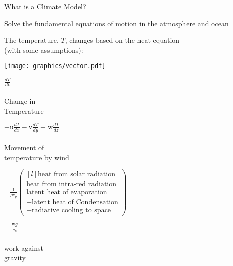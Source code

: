 \begin{slide}{What is a Climate Model?\pauseHS}

\begin{list0}
\item Solve the fundamental equations of motion in the atmosphere and ocean
\pauseHS

\item
\begin{minipage}{0.68\linewidth}
The temperature, $T$, changes based on the heat equation\\(with some assumptions):
\end{minipage}
\begin{minipage}{0.3\linewidth} 
\texttt{[image: graphics/vector.pdf]}
\end{minipage}\pauseHS

\vspace{0.7in}
\hspace{-0.5in}
\begin{minipage}{0.16\linewidth}\centering
$\frac{d T}{d t}=$ \\ \ \\
Change in \\
Temperature \pauseHS
\end{minipage}
%
\begin{minipage}{0.27\linewidth}\centering
$-\text{u} \frac{dT}{dx} - \text{v} \frac{dT}{dy} - \text{w} \frac{dT}{dz}$\\
\ \\Movement of \\
temperature by wind \pauseHS
\end{minipage}
%
\begin{minipage}{0.45\linewidth}\centering\vspace{-0.7in}
$+\frac{1}{\rho c_p}
\begin{pmatrix*}[l]
\text{heat from solar radiation}\\
\text{heat from intra-red radiation}\\
\text{latent heat of evaporation}\\
-\text{latent heat of Condensation}\\
-\text{radiative cooling to space}
\end{pmatrix*}$\pauseHS
\end{minipage}
%
\begin{minipage}{0.14\linewidth}\centering
$-~\frac{\text{w} g}{c_p} $ \\ \ \\
work against\\
gravity\pauseHS
\end{minipage}


\end{list0}
\end{slide}
